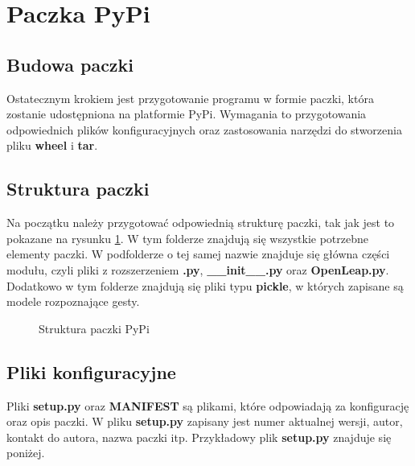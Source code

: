 
\section{Paczka PyPi}

\subsection{Budowa paczki}

\quad Ostatecznym krokiem jest przygotowanie programu w formie paczki, która zostanie udostępniona na platformie PyPi. Wymagania to przygotowania odpowiednich plików konfiguracyjnych oraz zastosowania narzędzi do stworzenia pliku \textbf{wheel} i \textbf{tar}. 

\subsection{Struktura paczki}
\quad Na początku należy przygotować odpowiednią strukturę paczki, tak jak jest to pokazane na rysunku \ref{tree:pypi_package}. W tym folderze znajdują się wszystkie potrzebne elementy paczki. W podfolderze o tej samej nazwie znajduje się główna części modułu, czyli pliki z rozszerzeniem \textbf{.py}, \textbf{\_\_init\_\_.py} oraz \textbf{OpenLeap.py}. Dodatkowo w tym folderze znajdują się pliki typu \textbf{pickle}, w których zapisane są modele rozpoznające gesty.

\begin{figure}
\centering
    \begin{minipage}{7cm}
    \end{minipage}
    \caption{Struktura paczki PyPi}
    \label{tree:pypi_package}
\end{figure}

\subsection{Pliki konfiguracyjne}
\quad Pliki \textbf{setup.py} oraz \textbf{MANIFEST} są plikami, które odpowiadają za konfigurację oraz opis paczki. W pliku \textbf{setup.py} zapisany jest numer aktualnej wersji, autor, kontakt do autora, nazwa paczki itp. Przykładowy plik \textbf{setup.py} znajduje się poniżej. \newline

